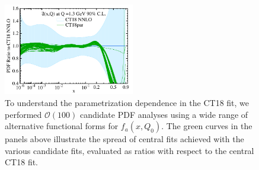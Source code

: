 \begin{figure}[tb]
        \includegraphics[width=0.51\textwidth]{fig/params/dbar_par_CT18_ect.pdf}
        \caption{
	To understand the parametrization dependence in the CT18 fit, we performed $\mathcal{O}(100)$ candidate
	PDF analyses using a wide range of alternative functional forms for $f_a(x,Q_0)$. The green curves
	in the panels above illustrate the spread of central fits achieved with the various candidate fits,
	evaluated as ratios with respect to the central CT18 fit.
		}
\label{fig:params}
\end{figure}
\clearpage
